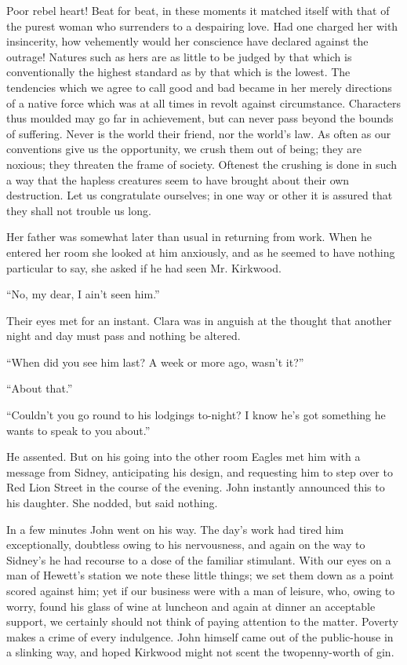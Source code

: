 Poor rebel heart! Beat for beat, in these moments it matched itself with
that of the purest woman who surrenders to a despairing love. Had one
charged her with insincerity, how vehemently would her conscience have
declared against the outrage! Natures such as hers are as little to be
judged by that which is conventionally the highest standard as by that
which is the lowest. The tendencies which we agree to call good and bad
became {}in her merely directions of a native force which was at all
times in revolt against circumstance. Characters thus moulded may go far
in achievement, but can never pass beyond the bounds of suffering. Never
is the world their friend, nor the world's law. As often as our
conventions give us the opportunity, we crush them out of being; they
are noxious; they threaten the frame of society. Oftenest the crushing
is done in such a way that the hapless creatures seem to have brought
about their own destruction. Let us congratulate ourselves; in one way
or other it is assured that they shall not trouble us long.

Her father was somewhat later than usual in returning from work. When he
entered her room she looked at him anxiously, and as he seemed to have
nothing particular to say, she asked if he had seen Mr. Kirkwood.

``No, my dear, I ain't seen him.''

Their eyes met for an instant. Clara was in anguish at the thought that
another night and day must pass and nothing be altered.

``When did you see him last? A week or more ago, wasn't it?''

``About that.''

{}``Couldn't you go round to his lodgings to-night? I know he's got
something he wants to speak to you about.''

He assented. But on his going into the other room Eagles met him with a
message from Sidney, anticipating his design, and requesting him to step
over to Red Lion Street in the course of the evening. John instantly
announced this to his daughter. She nodded, but said nothing.

In a few minutes John went on his way. The day's work had tired him
exceptionally, doubtless owing to his nervousness, and again on the way
to Sidney's he had recourse to a dose of the familiar stimulant. With
our eyes on a man of Hewett's station we note these little things; we
set them down as a point scored against him; yet if our business were
with a man of leisure, who, owing to worry, found his glass of wine at
luncheon and again at dinner an acceptable support, we certainly should
not think of paying attention to the matter. Poverty makes a crime of
every indulgence. John himself came out of the public-house in a
slinking way, and hoped Kirkwood might not scent the twopenny-worth of
gin.

